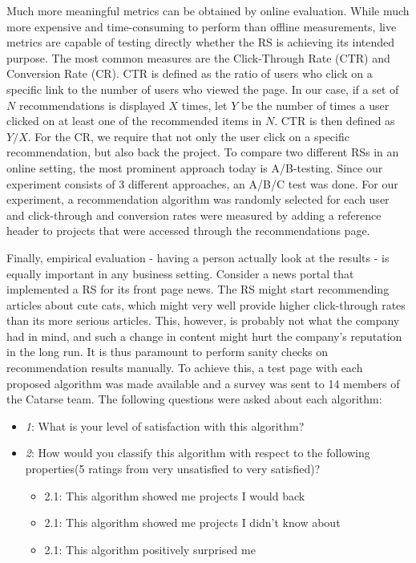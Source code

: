 \documentclass[cic,tc,english]{iiufrgs}
\begin{document}
Much more meaningful metrics can be obtained by online evaluation. While much more expensive and time-consuming to perform than offline measurements, live metrics are capable of testing directly whether the RS is achieving its intended purpose. The most common measures are the Click-Through Rate (CTR) and Conversion Rate (CR). CTR is defined as the ratio of users who click on a specific link to the number of users who viewed the page. In our case, if a set of $N$ recommendations is displayed $X$ times, let $Y$ be the number of times a user clicked on at least one of the recommended items in $N$. CTR is then defined as $Y/X$. For the CR, we require that not only the user click on a specific recommendation, but also back the project. To compare two different RSs in an online setting, the most prominent approach today is A/B-testing. Since our experiment consists of 3 different approaches, an A/B/C test was done. For our experiment, a recommendation algorithm was randomly selected for each user and click-through and conversion rates were measured by adding a reference header to projects that were accessed through the recommendations page.

Finally, empirical evaluation - having a person actually look at the results - is equally important in any business setting. Consider a news portal that implemented a RS for its front page news. The RS might start recommending articles about cute cats, which might very well provide higher click-through rates than its more serious articles. This, however, is probably not what the company had in mind, and such a change in content might hurt the company's reputation in the long run. It is thus paramount to perform sanity checks on recommendation results manually. To achieve this, a test page with each proposed algorithm was made available and a survey was sent to 14 members of the Catarse team. The following questions were asked about each algorithm:

\begin{itemize}
    \item \emph{1}: What is your level of satisfaction with this algorithm?
    \item \emph{2}: How would you classify this algorithm with respect to the following properties(5 ratings from very unsatisfied to very satisfied)?
    \begin {itemize}
    \item 2.1: This algorithm showed me projects I would back
    \item 2.1: This algorithm showed me projects I didn't know about
    \item 2.1: This algorithm positively surprised me 
    \end{itemize}
\end{itemize}
\end{document}
